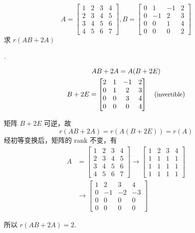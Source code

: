 \begin{example}
    \[
        A = \begin{bmatrix}
            1 & 2 & 3 & 4 \\
            2 & 3 & 4 & 5 \\
            3 & 4 & 5 & 6 \\
            4 & 5 & 6 & 7 
        \end{bmatrix}, 
        B = \begin{bmatrix}
            0 & 1  & -1 &  2 \\
            0 & -1 &  2 &  3 \\
            0 & 0  & 1  & 4 \\
            0 & 0  & 0  & 2
        \end{bmatrix}
    \]
    求 $r(AB + 2A)$

    \cite[question 314]{w660}.

    \begin{gather*}
        AB + 2A = A(B + 2E) \\ 
        B + 2E = \begin{bmatrix}
            2 & 1 & -1 & 2 \\ 
            0 & 1 & 2  & 3 \\
            0 & 0 & 3  & 4 \\
            0 & 0 & 0  & 4 
        \end{bmatrix} \quad (\mbox{\small invertible})
    \end{gather*}

    矩阵 $B + 2E$ 可逆，故
    \[
        r(AB + 2A) = r(A(B + 2E)) = r(A)
    \]
    经初等变换后，矩阵的 rank 不变，有
    \begin{align*}
        A &= \begin{bmatrix}
            1 & 2 & 3 & 4 \\
            2 & 3 & 4 & 5 \\
            3 & 4 & 5 & 6 \\
            4 & 5 & 6 & 7 
        \end{bmatrix}
        \rightarrow 
        \begin{bmatrix}
            1 & 2 & 3 & 4 \\
            1 & 1 & 1 & 1 \\
            1 & 1 & 1 & 1 \\
            1 & 1 & 1 & 1 
        \end{bmatrix} \\
          &\rightarrow 
        \begin{bmatrix}
            1 & 2  & 3  & 4 \\
            0 & -1 & -2 & -3 \\
            0 & 0  & 0  & 0 \\
            0 & 0  & 0  & 0
        \end{bmatrix}
    \end{align*}

    所以 $r(AB + 2A) = 2$.
\end{example}
